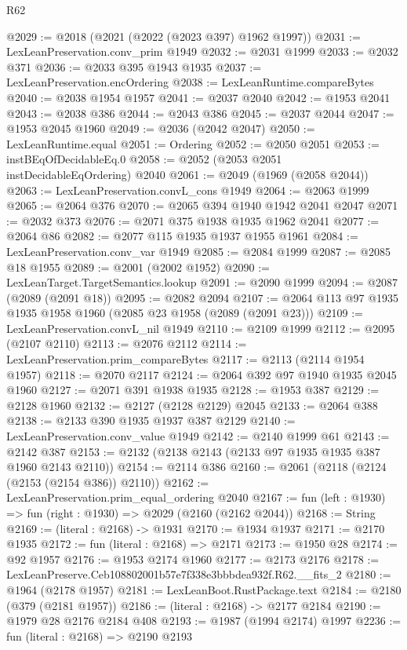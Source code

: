 \begin{lexlean}{R62}
\begin{coremodule}
@2029 := @2018 (@2021 (@2022 (@2023 @397) @1962 @1997))
@2031 := LexLeanPreservation.conv_prim @1949
@2032 := @2031 @1999
@2033 := @2032 @371
@2036 := @2033 @395 @1943 @1935
@2037 := LexLeanPreservation.encOrdering
@2038 := LexLeanRuntime.compareBytes
@2040 := @2038 @1954 @1957
@2041 := @2037 @2040
@2042 := @1953 @2041
@2043 := @2038 @386
@2044 := @2043 @386
@2045 := @2037 @2044
@2047 := @1953 @2045 @1960
@2049 := @2036 (@2042 @2047)
@2050 := LexLeanRuntime.equal
@2051 := Ordering
@2052 := @2050 @2051
@2053 := instBEqOfDecidableEq.{0}
@2058 := @2052 (@2053 @2051 instDecidableEqOrdering) @2040
@2061 := @2049 (@1969 (@2058 @2044))
@2063 := LexLeanPreservation.convL_cons @1949
@2064 := @2063 @1999
@2065 := @2064 @376
@2070 := @2065 @394 @1940 @1942 @2041 @2047
@2071 := @2032 @373
@2076 := @2071 @375 @1938 @1935 @1962 @2041
@2077 := @2064 @86
@2082 := @2077 @115 @1935 @1937 @1955 @1961
@2084 := LexLeanPreservation.conv_var @1949
@2085 := @2084 @1999
@2087 := @2085 @18 @1955
@2089 := @2001 (@2002 @1952)
@2090 := LexLeanTarget.TargetSemantics.lookup
@2091 := @2090 @1999
@2094 := @2087 (@2089 (@2091 @18))
@2095 := @2082 @2094
@2107 := @2064 @113 @97 @1935 @1935 @1958 @1960 (@2085 @23 @1958 (@2089 (@2091 @23)))
@2109 := LexLeanPreservation.convL_nil @1949
@2110 := @2109 @1999
@2112 := @2095 (@2107 @2110)
@2113 := @2076 @2112
@2114 := LexLeanPreservation.prim_compareBytes
@2117 := @2113 (@2114 @1954 @1957)
@2118 := @2070 @2117
@2124 := @2064 @392 @97 @1940 @1935 @2045 @1960
@2127 := @2071 @391 @1938 @1935
@2128 := @1953 @387
@2129 := @2128 @1960
@2132 := @2127 (@2128 @2129) @2045
@2133 := @2064 @388
@2138 := @2133 @390 @1935 @1937 @387 @2129
@2140 := LexLeanPreservation.conv_value @1949
@2142 := @2140 @1999 @61
@2143 := @2142 @387
@2153 := @2132 (@2138 @2143 (@2133 @97 @1935 @1935 @387 @1960 @2143 @2110))
@2154 := @2114 @386
@2160 := @2061 (@2118 (@2124 (@2153 (@2154 @386)) @2110))
@2162 := LexLeanPreservation.prim_equal_ordering @2040
@2167 := fun (left : @1930) => fun (right : @1930) => @2029 (@2160 (@2162 @2044))
@2168 := String
@2169 := (literal : @2168) -> @1931
@2170 := @1934 @1937
@2171 := @2170 @1935
@2172 := fun (literal : @2168) => @2171
@2173 := @1950 @28
@2174 := @92 @1957
@2176 := @1953 @2174 @1960
@2177 := @2173 @2176
@2178 := LexLeanPreserve.Ceb108802001b57e7f338e3bbbdea932f.R62.__fits_2
@2180 := @1964 (@2178 @1957)
@2181 := LexLeanBoot.RustPackage.text
@2184 := @2180 (@379 (@2181 @1957))
@2186 := (literal : @2168) -> @2177 @2184
@2190 := @1979 @28 @2176 @2184 @408
@2193 := @1987 (@1994 @2174) @1997
@2236 := fun (literal : @2168) =>
  @2190
    @2193

\end{coremodule}
\end{lexlean}

